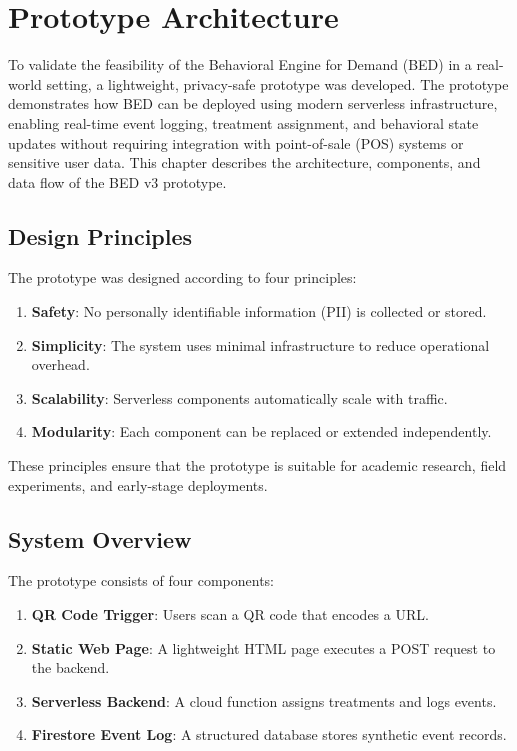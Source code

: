 \chapter{Prototype Architecture}

To validate the feasibility of the Behavioral Engine for Demand (BED) in a
real-world setting, a lightweight, privacy-safe prototype was developed. The
prototype demonstrates how BED can be deployed using modern serverless
infrastructure, enabling real-time event logging, treatment assignment, and
behavioral state updates without requiring integration with point-of-sale (POS)
systems or sensitive user data. This chapter describes the architecture,
components, and data flow of the BED v3 prototype.

\section{Design Principles}

The prototype was designed according to four principles:

\begin{enumerate}
    \item \textbf{Safety}: No personally identifiable information (PII) is
    collected or stored.
    \item \textbf{Simplicity}: The system uses minimal infrastructure to reduce
    operational overhead.
    \item \textbf{Scalability}: Serverless components automatically scale with
    traffic.
    \item \textbf{Modularity}: Each component can be replaced or extended
    independently.
\end{enumerate}

These principles ensure that the prototype is suitable for academic research,
field experiments, and early-stage deployments.

\section{System Overview}

The prototype consists of four components:

\begin{enumerate}
    \item \textbf{QR Code Trigger}: Users scan a QR code that encodes a URL.
    \item \textbf{Static Web Page}: A lightweight HTML page executes a POST
    request to the backend.
    \item \textbf{Serverless Backend}: A cloud function assigns treatments and
    logs events.
    \item \textbf{Firestore Event Log}: A structured database stores synthetic
    event records.
\end{enumerate}

